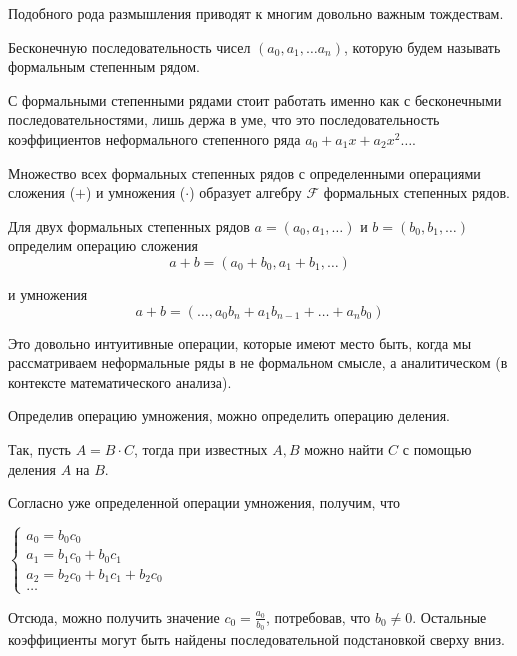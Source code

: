 Подобного рода размышления приводят к многим довольно важным тождествам.

\begin{definition}
    Бесконечную последовательность чисел $(a_0, a_1, \dots a_n)$, 
    которую будем называть формальным степенным рядом.
\end{definition}

С формальными степенными рядами стоит работать именно как с бесконечными последовательностями, 
лишь держа в уме, что это последовательность коэффициентов неформального
степенного ряда $a_0 + a_1 x + a_2 x^2 \dots$. 

\begin{definition}
    Множество всех формальных степенных рядов с определенными операциями сложения ($+$) и умножения ($\cdot$)
    образует алгебру $\mathcal{F}$ формальных степенных рядов.

    Для двух формальных степенных рядов $a = (a_0, a_1, \dots)$ и  $b = (b_0, b_1, \dots)$ определим операцию сложения
    \begin{equation*}
        a + b = (a_0 + b_0, a_1 + b_1, \dots)
    \end{equation*}

    и умножения
    \begin{equation*}
        a + b = (\dots, a_0 b_n + a_1 b_{n - 1} + \dots + a_n b_0)
    \end{equation*}
\end{definition}

Это довольно интуитивные операции, которые имеют место быть, когда мы рассматриваем
неформальные ряды в не формальном смысле, а аналитическом (в контексте математического анализа).

Определив операцию умножения, можно определить операцию деления.

Так, пусть $A = B \cdot C$, тогда при известных $A, B$ можно найти $C$ 
с помощью деления $A$ на $B$.

Согласно уже определенной операции умножения, получим, что

$\begin{cases}
    a_0 = b_0  c_0 \\
    a_1 = b_1 c_0 + b_0 c_1 \\
    a_2 = b_2 c_0 + b_1 c_1 + b_2 c_0 \\
    \dots
\end{cases}$

Отсюда, можно получить значение $c_0 = \frac{a_0}{b_0}$, потребовав, что $b_0 \neq 0$.
Остальные коэффициенты могут быть найдены последовательной подстановкой сверху вниз.

